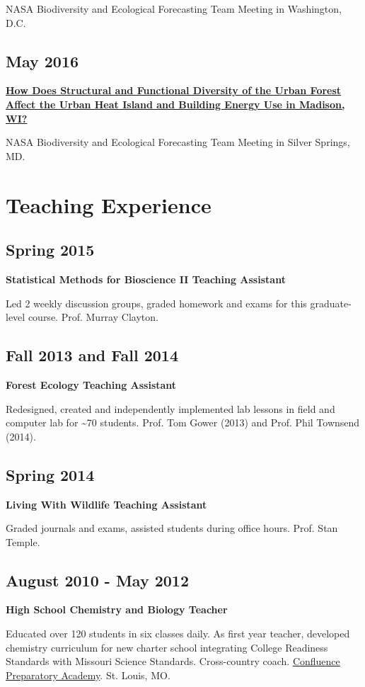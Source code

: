 \documentclass{article}
\begin{document}
NASA Biodiversity and Ecological Forecasting Team Meeting in
Washington, D.C.
\subsection*{May 2016}
\label{sec:orgaa5ba70}
\textbf{\href{http://pages.stat.wisc.edu/\~erker/Posters/NASA\_poster\_2016.jp2}{How Does Structural and Functional Diversity of the Urban Forest
Affect the Urban Heat Island and Building Energy Use in Madison, WI?}}

NASA Biodiversity and Ecological Forecasting Team Meeting in Silver Springs, MD.
\section*{Teaching Experience}
\label{sec:org78e729a}
\subsection*{Spring 2015}
\label{sec:org1e6ee26}
\textbf{Statistical Methods for Bioscience II Teaching Assistant}

Led 2 weekly discussion groups, graded homework and exams for this
graduate-level course. Prof. Murray Clayton.

\subsection*{Fall 2013 and Fall 2014}
\label{sec:orgbacc521}
\textbf{Forest Ecology Teaching Assistant}

Redesigned, created and independently implemented lab lessons in field and computer lab for \textasciitilde{}70
students.  Prof. Tom Gower (2013) and Prof. Phil Townsend (2014).

\subsection*{Spring 2014}
\label{sec:org8fb58aa}
\textbf{Living With Wildlife Teaching Assistant}

Graded journals and exams, assisted students during office hours.
Prof. Stan Temple.

\subsection*{August 2010 - May 2012}
\label{sec:orgda778c4}
\textbf{High School Chemistry and Biology Teacher}

Educated over 120 students in six classes daily. As first year
teacher, developed chemistry curriculum for new charter school
integrating College Readiness Standards with Missouri Science
Standards. Cross-country coach. \href{https://www.google.com/search?q=Confluence+Preparatory+Academy+St.+Louis\&oq=Confluence+Prep+Academy+St.+Louis\&aqs=chrome..69i57.7294j0j8\&sourceid=chrome\&ie=UTF-8\#q=Confluence+Prep+Academy+High+School+St.+Louis}{Confluence Preparatory Academy}. St. Louis, MO.
\end{document}
